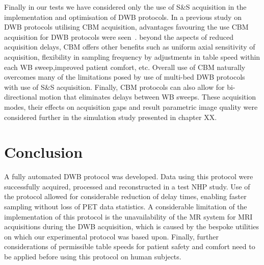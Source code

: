 Finally in our tests we have considered only the use of S\&S acquisition in the implementation and optimisation of DWB protocols. 
In a previous study on DWB protocols utilising CBM acquisition, advantages favouring the use CBM acquisition for DWB protocols were seen~\cite{Karakatsanis2016}. beyond the aspects of reduced acquisition delays, CBM offers other benefits such as uniform axial sensitivity of acquisition, flexibility in sampling frequency by adjustments in table speed within each WB sweep,improved patient comfort, etc. 
Overall use of CBM naturally overcomes many of the limitations posed by use of multi-bed DWB protocols with use of S\&S acquisition. 
Finally, CBM protocols can also allow for bi-directional motion that eliminates delays between WB sweeps. 
These acquisition modes, their effects on acquisition gaps and result parametric image quality were considered further in the simulation study presented in chapter XX.

\section{Conclusion}
A fully automated DWB protocol was developed. Data using this protocol were successfully acquired, processed and reconstructed in a test NHP study.
Use of the protocol allowed for considerable reduction of delay times, enabling faster sampling without loss of PET data statistics.
A considerable limitation of the implementation of this protocol is the unavailability of the MR system for MRI acquisitions during the DWB acquisition, which is caused by the bespoke utilities on which our experimental protocol was based upon.
Finally, further considerations of permissible table speeds for patient safety and comfort need to be applied before using this protocol on human subjects.



